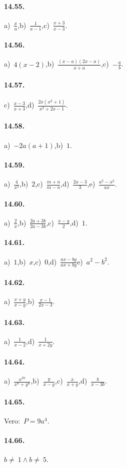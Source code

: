 \paragraph{14.55.}
a)~$\frac{x}{a}$,\quad b)~$\frac{1}{a-1}$,\quad c)~$\frac{x+3}{x-3}$.

\paragraph{14.56.}
a)~$4(x-2)$,\quad b)~$\frac{(x-a)(2x-a)}{x+a}$,\quad c)~$-\frac{a}{b}$.

\paragraph{14.57.}
c)~$\frac{x-3}{x+3}$,\quad d)~$\frac{2x\left(x^{2}+1\right)}{x^{2}+2x-1}$.

\paragraph{14.58.}
a)~$-2a(a+1)$,\quad b)~$1$.

\paragraph{14.59.}
a)~$\frac{4}{x^{2}}$,\quad b)~$2$,\quad c)~$\frac{m+n}{m-n}$,\quad d)~$\frac{2a-3}{3}$,\quad e)~$\frac{a^{2}-x^{2}}{ax}$.

\paragraph{14.60.}
a)~$\frac{2}{x}$,\quad b)~$\frac{2a+3b}{2a-3b}$,\quad c)~$\frac{x-y}{2}$,\quad d)~$1$.

\paragraph{14.61.}
a)~$1$,\quad b)~$x$,\quad c)~$0$,\quad d)~$\frac{ax-by}{ax+by}$\quad e)~$a^{2}-b^{2}$.

\paragraph{14.62.}
a)~$\frac{x+y}{x-y}$,\quad b)~$\frac{x-1}{2x-3}$.

\paragraph{14.63.}
a)~$\frac{1}{x-2}$,\quad d)~$\frac{1}{x+2y}$.

\paragraph{14.64.}
a)~$\frac{x^{2n}}{x^{n}+y^{n}}$,\quad b)~$\frac{y}{x-y}$,\quad c)~$\frac{x}{x+y}$,\quad d)~$\frac{b}{x-3b}$.

\paragraph{14.65.}Vero:~$P=9a^{4}$.

\paragraph{14.66.}$b\neq~1\wedge b\neq~5$.
